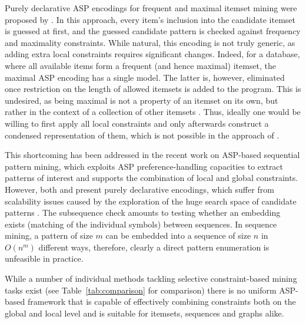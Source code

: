  Purely declarative ASP encodings for frequent and maximal itemset mining were proposed by \textcite{DBLP:conf/lpnmr/Jarvisalo11}. In this approach, every item's inclusion into the candidate itemset is guessed at first, and the guessed candidate pattern is checked against frequency and maximality constraints. While natural, this encoding is not  truly generic, as adding extra local constraints requires significant changes. Indeed, for a database, where all available items form a frequent (and hence maximal) itemset, the maximal ASP encoding has a single model. The latter is, however, eliminated once restriction on the length of allowed itemsets is added to the program. This is undesired, as being maximal
is not a  property of an itemset on its own, but rather %
in the context of a collection of other itemsets \parencite{DBLP:journals/kais/BonchiL06}. Thus, ideally one would be willing to first apply all local constraints and only afterwards construct a condensed representation of them, which is not possible in the approach of  \textcite{DBLP:conf/lpnmr/Jarvisalo11}. %

This shortcoming has been addressed in the recent work \parencite{DBLP:conf/ijcai/GebserGQ0S16} on ASP-based sequential pattern mining, which exploits ASP preference-handling capacities to extract patterns of interest and supports the combination of local and global constraints. However, both \textcite{DBLP:conf/ijcai/GebserGQ0S16} and \textcite{DBLP:conf/lpnmr/Jarvisalo11} present %
purely declarative encodings, which suffer from scalability issues caused by the exploration of the huge search space of candidate patterns . The subsequence check amounts to testing whether an embedding exists (matching of the individual symbols) between sequences. In sequence mining, a pattern of size $m$ can be embedded into a sequence of size $n$ in $O(n^m)$ different ways, therefore, clearly a direct pattern enumeration is unfeasible in practice. 

While a number of individual methods tackling selective constraint-based mining tasks exist (see Table~\ref{tab:comparison} for comparison) there is no uniform ASP-based framework that is capable of effectively combining constraints both on the global and local level and is suitable for itemsets, sequences and graphs alike.

